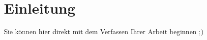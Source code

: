 \chapter{Einleitung}
    \label{ch:intro}
    
    Sie können hier direkt mit dem Verfassen Ihrer Arbeit beginnen ;)
